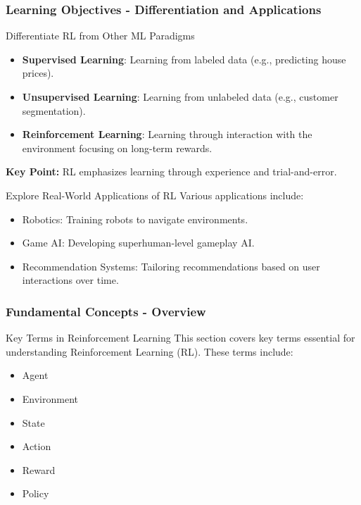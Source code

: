 \documentclass[aspectratio=169]{beamer}
\begin{document}
\begin{frame}[fragile]
    \frametitle{Learning Objectives - Differentiation and Applications}
    \begin{block}{Differentiate RL from Other ML Paradigms}
        \begin{itemize}
            \item \textbf{Supervised Learning}: Learning from labeled data (e.g., predicting house prices).
            \item \textbf{Unsupervised Learning}: Learning from unlabeled data (e.g., customer segmentation).
            \item \textbf{Reinforcement Learning}: Learning through interaction with the environment focusing on long-term rewards.
        \end{itemize}
        \textbf{Key Point:} RL emphasizes learning through experience and trial-and-error.
    \end{block}

    \begin{block}{Explore Real-World Applications of RL}
        Various applications include:
        \begin{itemize}
            \item Robotics: Training robots to navigate environments.
            \item Game AI: Developing superhuman-level gameplay AI.
            \item Recommendation Systems: Tailoring recommendations based on user interactions over time.
        \end{itemize}
    \end{block}
\end{frame}

\begin{frame}[fragile]
    \frametitle{Fundamental Concepts - Overview}
    \begin{block}{Key Terms in Reinforcement Learning}
        This section covers key terms essential for understanding Reinforcement Learning (RL). These terms include:
        \begin{itemize}
            \item Agent
            \item Environment
            \item State
            \item Action
            \item Reward
            \item Policy
        \end{itemize}
    \end{block}
\end{frame}
\end{document}
